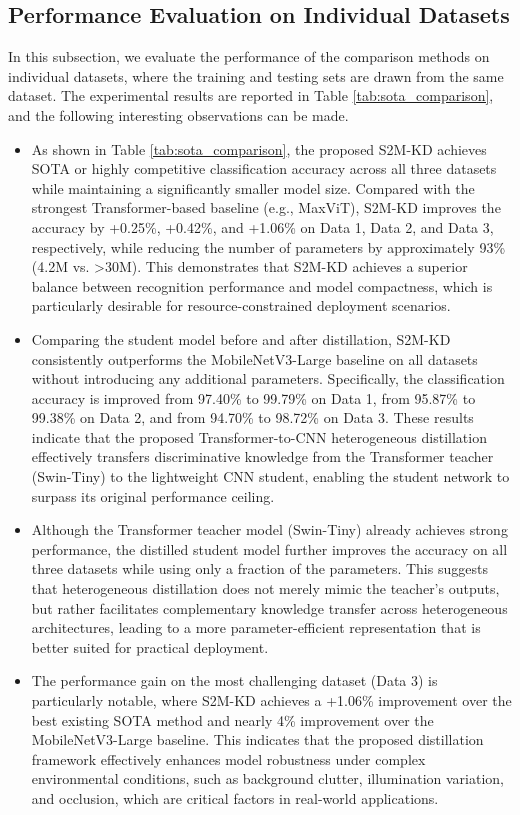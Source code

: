 \documentclass[review]{elsarticle}
\begin{document}
\subsection{Performance Evaluation on Individual Datasets} \label{subsec:persota}
In this subsection, we evaluate the performance of the comparison methods on individual datasets, where the training and testing sets are drawn from the same dataset. The experimental results are reported in Table \ref{tab:sota_comparison}, and the following interesting observations can be made.
\begin{itemize}
\item As shown in Table \ref{tab:sota_comparison}, the proposed S2M-KD achieves SOTA or highly competitive classification accuracy across all three datasets while maintaining a significantly smaller model size. Compared with the strongest Transformer-based baseline (e.g., MaxViT), S2M-KD improves the accuracy by +0.25\%, +0.42\%, and +1.06\% on Data 1, Data 2, and Data 3, respectively, while reducing the number of parameters by approximately 93\% (4.2M vs. >30M). This demonstrates that S2M-KD achieves a superior balance between recognition performance and model compactness, which is particularly desirable for resource-constrained deployment scenarios.
\item Comparing the student model before and after distillation, S2M-KD consistently outperforms the MobileNetV3-Large baseline on all datasets without introducing any additional parameters. Specifically, the classification accuracy is improved from 97.40\% to 99.79\% on Data 1, from 95.87\% to 99.38\% on Data 2, and from 94.70\% to 98.72\% on Data 3. These results indicate that the proposed Transformer-to-CNN heterogeneous distillation effectively transfers discriminative knowledge from the Transformer teacher (Swin-Tiny) to the lightweight CNN student, enabling the student network to surpass its original performance ceiling.
\item Although the Transformer teacher model (Swin-Tiny) already achieves strong performance, the distilled student model further improves the accuracy on all three datasets while using only a fraction of the parameters. This suggests that heterogeneous distillation does not merely mimic the teacher's outputs, but rather facilitates complementary knowledge transfer across heterogeneous architectures, leading to a more parameter-efficient representation that is better suited for practical deployment.

\item The performance gain on the most challenging dataset (Data 3) is particularly notable, where S2M-KD achieves a +1.06\% improvement over the best existing SOTA method and nearly 4\% improvement over the MobileNetV3-Large baseline. This indicates that the proposed distillation framework effectively enhances model robustness under complex environmental conditions, such as background clutter, illumination variation, and occlusion, which are critical factors in real-world applications.


\end{itemize}
\end{document}
